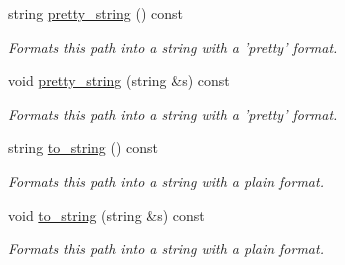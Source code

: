 \begin{DoxyCompactItemize}
string \hyperlink{classlgraph_1_1utils_1_1boolean__path_a3a562317b24dfc0abc3d8eb1e834eceb}{pretty\-\_\-string} () const 
\begin{DoxyCompactList}\small\item\em Formats this path into a string with a 'pretty' format. \end{DoxyCompactList}\item 
void \hyperlink{classlgraph_1_1utils_1_1boolean__path_a772943b08c2cdca78583a2c539093db2}{pretty\-\_\-string} (string \&s) const 
\begin{DoxyCompactList}\small\item\em Formats this path into a string with a 'pretty' format. \end{DoxyCompactList}\item 
string \hyperlink{classlgraph_1_1utils_1_1boolean__path_a3ca892df161835a80430d540ca883ab1}{to\-\_\-string} () const 
\begin{DoxyCompactList}\small\item\em Formats this path into a string with a plain format. \end{DoxyCompactList}\item 
void \hyperlink{classlgraph_1_1utils_1_1boolean__path_a86bbdb236fc31e2abd09f6029548b181}{to\-\_\-string} (string \&s) const 
\begin{DoxyCompactList}\small\item\em Formats this path into a string with a plain format. \end{DoxyCompactList}\end{DoxyCompactItemize}
